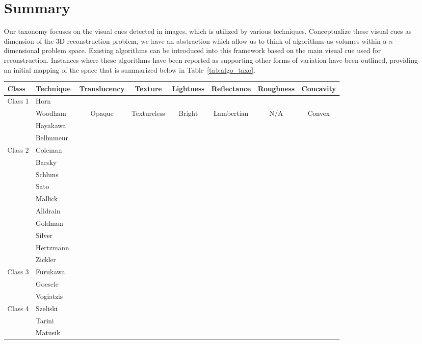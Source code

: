 \section{Summary}
Our taxonomy focuses on the visual cues detected in images, which is utilized by various techniques. Conceptualize these visual cues as dimension of the 3D reconstruction problem, we have an abstraction which allow us to think of algorithms as volumes within a $n-$dimensional problem space. Existing algorithms can be introduced into this framework based on the main visual cue used for reconstruction. Instances where these algorithms have been reported as supporting other forms of variation have been outlined, providing an initial mapping of the space that is summarized below in Table~\ref{tab:algo_taxo}.
\begin{sidewaystable}[h]
  \centering
  \begin{tabular}{*{2}{l}*{6}{c}}
  \hline
  \textbf{Class} & \textbf{Technique} & Translucency & Texture & Lightness & Reflectance & Roughness & Concavity\\
  \hline
  Class 1 & Horn~\cite{horn1989shape} \\
  & Woodham~\cite{woodham1980photometric} & Opaque & Textureless & Bright & Lambertian & N/A & Convex\\
  & Hayakawa~\cite{hayakawa1994photometric} \\
  & Belhumeur~\cite{belhumeur1999bas} \\
  \hline
  Class 2 & Coleman~\cite{coleman1982obtaining} \\
  & Barsky~\cite{barsky20034} \\
  & Schluns~\cite{schluns1993photometric} \\
  & Sato~\cite{sato1994temporal} \\
  & Mallick~\cite{mallick2005beyond} \\
  & Alldrain~\cite{alldrin2008photometric} \\
  & Goldman~\cite{goldman2010shape} \\
  & Silver~\cite{silver1980determining}\\
  & Hertzmann~\cite{hertzmann2005example} \\
  & Zickler~\cite{zickler2002helmholtz} \\
  \hline
  Class 3 & Furukawa~\cite{furukawa2010accurate} \\
  & Goesele~\cite{goesele2006multi} \\
  & Vogiatzis~\cite{vogiatzis2007multiview} \\
  \hline
  Class 4 & Szeliski~\cite{szeliski1993rapid} \\
  & Tarini~\cite{tarini2002marching} \\
  & Matusik~\cite{matusik2002efficient} \\
  \hline
  \end{tabular}
  \caption{Algorithm classification based on the new taxonomy}
  \label{tab:algo_taxo}
\end{sidewaystable}
